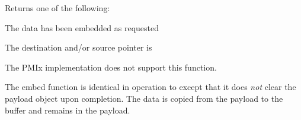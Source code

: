 Returns one of the following:
\begin{constantdesc}
\item {} The data has been embedded as requested
\item {} The destination and/or source pointer is 
\item {} The \ac{PMIx} implementation does not support this function.
\end{constantdesc}

\descr

The embed function is identical in operation to 
except that it does \emph{not} clear the payload object upon completion.  The data is copied from the payload to the buffer and remains in the payload. 

